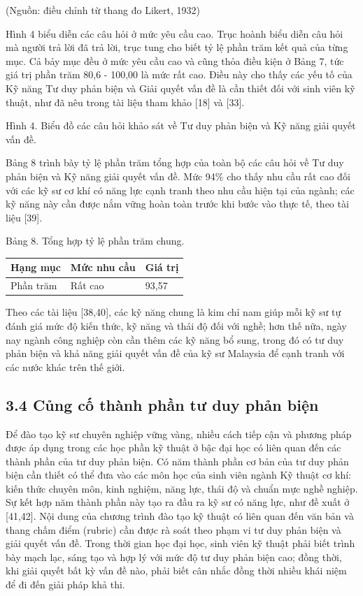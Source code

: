 (Nguồn: điều chỉnh từ thang đo Likert, 1932)

Hình 4 biểu diễn các câu hỏi ở mức yêu cầu cao. Trục hoành biểu diễn câu hỏi mà người trả lời đã trả lời, trục tung cho biết tỷ lệ phần trăm kết quả của từng mục. Cả bảy mục đều ở mức yêu cầu cao và cũng thỏa điều kiện ở Bảng 7, tức giá trị phần trăm 80,6 - 100,00 là mức rất cao. Điều này cho thấy các yếu tố của Kỹ năng Tư duy phản biện và Giải quyết vấn đề là cần thiết đối với sinh viên kỹ thuật, như đã nêu trong tài liệu tham khảo {[}18{]} và {[}33{]}.

Hình 4. Biểu đồ các câu hỏi khảo sát về Tư duy phản biện và Kỹ năng giải quyết vấn đề.

Bảng 8 trình bày tỷ lệ phần trăm tổng hợp của toàn bộ các câu hỏi về Tư duy phản biện và Kỹ năng giải quyết vấn đề. Mức 94\% cho thấy nhu cầu rất cao đối với các kỹ sư cơ khí có năng lực cạnh tranh theo nhu cầu hiện tại của ngành; các kỹ năng này cần được nắm vững hoàn toàn trước khi bước vào thực tế, theo tài liệu {[}39{]}.

Bảng 8. Tổng hợp tỷ lệ phần trăm chung.

{\small
\begin{longtable}[]{@{}lll@{}}
\toprule\noalign{}
Hạng mục & Mức nhu cầu & Giá trị \\
\midrule\noalign{}
\endhead
\bottomrule\noalign{}
\endlastfoot
Phần trăm & Rất cao & 93,57 \\
\end{longtable}
}

Theo các tài liệu {[}38,40{]}, các kỹ năng chung là kim chỉ nam giúp mỗi kỹ sư tự đánh giá mức độ kiến thức, kỹ năng và thái độ đối với nghề; hơn thế nữa, ngày nay ngành công nghiệp còn cần thêm các kỹ năng bổ sung, trong đó có tư duy phản biện và khả năng giải quyết vấn đề của kỹ sư Malaysia để cạnh tranh với các nước khác trên thế giới.

\subsection{3.4 Củng cố thành phần tư duy phản biện}

Để đào tạo kỹ sư chuyên nghiệp vững vàng, nhiều cách tiếp cận và phương pháp được áp dụng trong các học phần kỹ thuật ở bậc đại học có liên quan đến các thành phần của tư duy phản biện. Có năm thành phần cơ bản của tư duy phản biện cần thiết có thể đưa vào các môn học của sinh viên ngành Kỹ thuật cơ khí: kiến thức chuyên môn, kinh nghiệm, năng lực, thái độ và chuẩn mực nghề nghiệp. Sự kết hợp năm thành phần này tạo ra đầu ra kỹ sư có năng lực, như đề xuất ở {[}41,42{]}. Nội dung của chương trình đào tạo kỹ thuật có liên quan đến văn bản và thang chấm điểm (rubric) cần được rà soát theo phạm vi tư duy phản biện và giải quyết vấn đề. Trong thời gian học đại học, sinh viên kỹ thuật phải biết trình bày mạch lạc, sáng tạo và hợp lý với mức độ tư duy phản biện cao; đồng thời, khi giải quyết bất kỳ vấn đề nào, phải biết cân nhắc đồng thời nhiều khái niệm để đi đến giải pháp khả thi.

